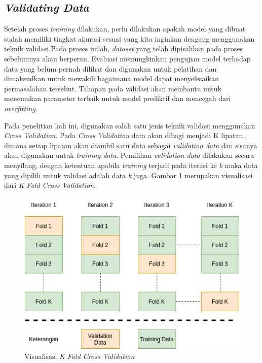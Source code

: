 \documentclass[conference]{IEEEtran}
\begin{document}
	\subsection{\textit{Validating Data}}
	\vspace{1ex}
	Setelah proses \textit{training} dilakukan, perlu dilakukan apakah model yang dibuat sudah memiliki tingkat akurasi sesuai yang kita inginkan dengang menggunakan teknik validasi.Pada proses inilah, \textit{dataset} yang telah dipisahkan pada proses sebelumnya akan berperan. Evaluasi memungkinkan pengujian model terhadap data yang belum pernah dilihat dan digunakan untuk pelatihan dan dimaksudkan untuk mewakili bagaimana model dapat menyelesaikan permasalahan tersebut. Tahapan pada validasi akan membantu untuk menemukan parameter terbaik untuk model prediktif dan mencegah dari \textit{overfitting}.
	
	Pada penelitian kali ini, digunakan salah satu jenis teknik validasi menggunakan \textit{Cross Validation}. Pada \textit{Cross Validation} data akan dibagi menjadi K lipatan, dimana setiap lipatan akan diambil satu data sebagai \textit{validation data} dan sisanya akan digunakan untuk \textit{training data}. Pemilihan \textit{validation data} dilakukan secara menyilang, dengan ketentuan apabila \textit{training} terjadi pada iterasi ke \textit{k} maka data yang dipilih untuk validasi adalah data \textit{k} juga. Gambar \ref{fig:cross-validation} merupakan visualisasi dari \textit{K Fold Cross Validation}.
	
	\begin{figure}[h]
		\centering
		\includegraphics[scale=0.35]{img/cross-validation.png}
		\caption{Visualisasi \textit{K Fold Cross Validation}}
		\label{fig:cross-validation}
	\end{figure} 
	
\end{document}
